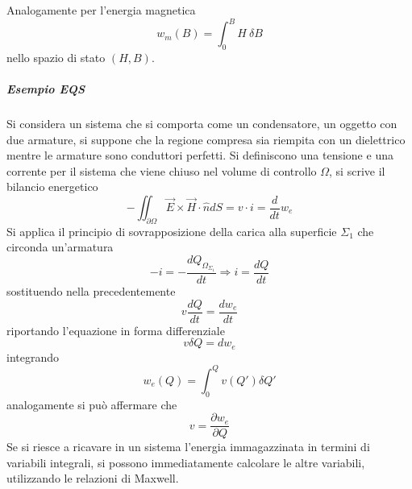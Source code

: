 Analogamente per l'energia magnetica
$$
w_m(B) = \int_0^B H\ \delta B
$$
nello spazio di stato $(H,B)$.

\subparagraph{Esempio EQS} Si considera un sistema che si comporta come un condensatore, un oggetto
con due armature, si suppone che la regione compresa sia riempita con un dielettrico mentre le armature
sono conduttori perfetti. Si definiscono una tensione e una corrente per il sistema che viene chiuso nel volume di controllo $\Omega$, si scrive il bilancio energetico
$$
-\iint_{\partial\Omega} \vec{E}\times\vec{H}\cdot\hat{n}dS = v\cdot i = \frac{d}{dt}w_e
$$
Si applica il principio di sovrapposizione della carica alla superficie $\Sigma_1$ che circonda un'armatura
$$
-i = -\frac{dQ_{\Omega_{\Sigma_1}}}{dt} \Rightarrow i = \frac{dQ}{dt}
$$
sostituendo nella precedentemente
$$
v\frac{dQ}{dt} = \frac{dw_e}{dt}
$$
riportando l'equazione in forma differenziale
$$
v\delta Q = dw_e
$$
integrando
$$
w_e(Q) = \int_0^Q v(Q')\delta Q'
$$
analogamente si può affermare che 
$$
v = \frac{\partial w_e}{\partial Q}
$$
Se si riesce a ricavare in un sistema l'energia immagazzinata in termini di variabili integrali, si possono immediatamente
calcolare le altre variabili, utilizzando le relazioni di Maxwell.

